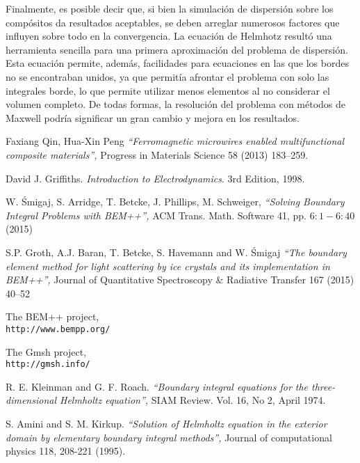 \documentclass[12pt,letterpaper]{report}
\numberwithin{equation}{section}
\begin{document}
Finalmente, es posible decir que, si bien la simulación de dispersión sobre los compósitos da resultados aceptables, se deben arreglar numerosos factores que influyen sobre todo en la convergencia. La ecuación de Helmhotz resultó una herramienta sencilla para una primera aproximación del problema de dispersión. Esta ecuación permite, además, facilidades para ecuaciones en las que los bordes no se encontraban unidos, ya que permitía afrontar el problema con solo las integrales borde, lo que permite utilizar menos elementos al no considerar el volumen completo. De todas formas, la resolución del problema con métodos de Maxwell podría significar un gran cambio y mejora en los resultados.
\pagebreak
{}%


\begin{thebibliography}{9}

	Faxiang Qin, Hua-Xin Peng
	\textit{``Ferromagnetic microwires enabled multifunctional composite materials'',} 
	Progress in Materials Science 58 (2013) 183–259.

	David J. Griffiths. 
	\textit{Introduction to Electrodynamics}. 
	3rd Edition, 1998.
	
	W. Śmigaj, S. Arridge, T. Betcke, J. Phillips, M. Schweiger, 
	\textit{``Solving Boundary Integral Problems with BEM++'',} 
	ACM Trans. Math. Software 41, pp. $6:1-6:40$ (2015)	
	
	S.P. Groth, A.J. Baran, T. Betcke, S. Havemann and W. Śmigaj
	\textit{``The boundary element method for light scattering by ice crystals and its implementation in BEM++'',} 
	Journal of Quantitative Spectroscopy \& Radiative Transfer 167 (2015) 40–52
	
	The BEM++ project,
	\\\texttt{http://www.bempp.org/}
	
	The Gmsh project,
	\\\texttt{http://gmsh.info/}		
	
	R. E. Kleinman and G. F. Roach. 
	\textit{``Boundary integral equations for the three-dimensional Helmholtz equation'',} 
	SIAM Review. Vol. 16, No 2, April 1974.
	
	S. Amini and S. M. Kirkup. 
	\textit{``Solution of Helmholtz equation in the exterior domain by elementary boundary integral methods'',} 
	Journal of computational physics 118, 208-221 (1995).	 	
	

\end{thebibliography}
\end{document}
